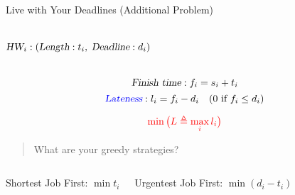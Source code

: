 
\begin{frame}{}
  \begin{exampleblock}{Live with Your Deadlines (Additional Problem)}
    \begin{columns}
        \pause
        \pause
	\[
	  \textsl{HW}_{i}: (\textsl{Length}: t_{i},\; \textsl{Deadline}: d_{i})
	\]
	\vspace{-0.60cm}
    \end{columns}
  \end{exampleblock}

  \pause
  \[
    \textsl{Finish time}: f_{i} = s_{i} + t_{i}
  \]
  \[
    \textcolor{blue}{\textsl{Lateness}}: l_i = f_{i} - d_{i} \quad (0 \text{ if } f_{i} \le d_{i})
  \]

  \pause
  \[
    \textcolor{red}{\min \big(L \triangleq \max_{i} l_i\big)}
  \]
\end{frame}

\begin{frame}{}
  \begin{quote}
    \centering
    {\Large What are your greedy strategies?}
  \end{quote}

\end{frame}

\begin{frame}{}
  \begin{columns}
      \centerline{\large Shortest Job First: $\min t_{i}$}

      \centerline{\large Urgentest Job First: $\min (d_{i} - t_{i})$}

  \end{columns}
\end{frame}

